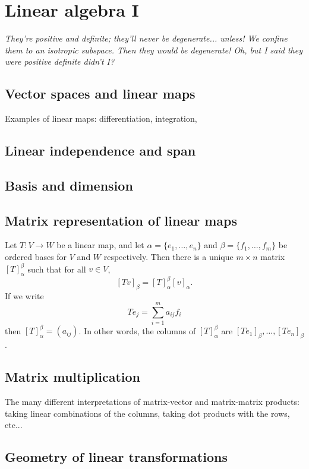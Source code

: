 \section{Linear algebra I}

\emph{They're positive and definite; they'll never be degenerate... unless! We confine them to an isotropic subspace. Then they would be degenerate! Oh, but I said they were positive definite didn't I?}

\subsection{Vector spaces and linear maps}

\begin{example}
Examples of linear maps: differentiation, integration,
\end{example}

\subsection{Linear independence and span}
\subsection{Basis and dimension}
\subsection{Matrix representation of linear maps}

Let $T : V \to W$ be a linear map, and let $\alpha = \{ e_1, \ldots, e_n \}$ and $\beta = \{ f_1, \ldots, f_m \}$ be ordered bases for $V$ and $W$ respectively. Then there is a unique $m \times n$ matrix $[T]_\alpha^\beta$ such that for all $v \in V$,
\[ [Tv]_\beta = [T]_\alpha^\beta [v]_\alpha. \]
If we write
\[ Te_j = \sum_{i=1}^m a_{ij} f_i \]
then $[T]_\alpha^\beta = (a_{ij})$. In other words, the columns of $[T]_\alpha^\beta$ are $[Te_1]_\beta, \ldots, [Te_n]_\beta$.

\subsection{Matrix multiplication}

The many different interpretations of matrix-vector and matrix-matrix products: taking linear combinations of the columns, taking dot products with the rows, etc...

\subsection{Geometry of linear transformations}

